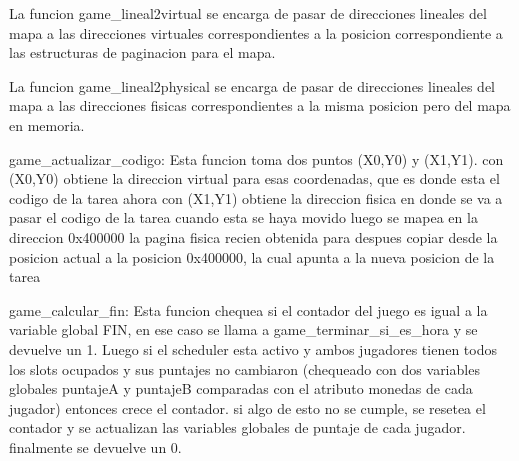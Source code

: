     La funcion game_lineal2virtual se encarga de pasar de direcciones lineales del mapa a las direcciones
    virtuales correspondientes a la posicion correspondiente a las estructuras de paginacion para el mapa.

    La funcion game_lineal2physical se encarga de pasar de direcciones lineales del mapa a las direcciones
    fisicas correspondientes a la misma posicion pero del mapa en memoria.

    game_actualizar_codigo:
      Esta funcion toma dos puntos (X0,Y0) y (X1,Y1).
      con (X0,Y0) obtiene la direccion virtual para esas coordenadas, que es donde esta el codigo de la tarea ahora
      con (X1,Y1) obtiene la direccion fisica en donde se va a pasar el codigo de la tarea cuando esta se haya movido
      luego se mapea en la direccion 0x400000 la pagina fisica recien obtenida
      para despues copiar desde la posicion actual a la posicion 0x400000, la cual apunta a la nueva posicion de la tarea

    game_calcular_fin:
      Esta funcion chequea si el contador del juego es igual a la variable global FIN, en ese caso se llama a game_terminar_si_es_hora
      y se devuelve un 1.
      Luego si el scheduler esta activo y ambos jugadores tienen todos los slots ocupados y sus puntajes no cambiaron
      (chequeado con dos variables globales puntajeA y puntajeB comparadas con el atributo monedas de cada jugador)
      entonces crece el contador.
      si algo de esto no se cumple, se resetea el contador y se actualizan las variables globales de puntaje de cada jugador.
      finalmente se devuelve un 0.
